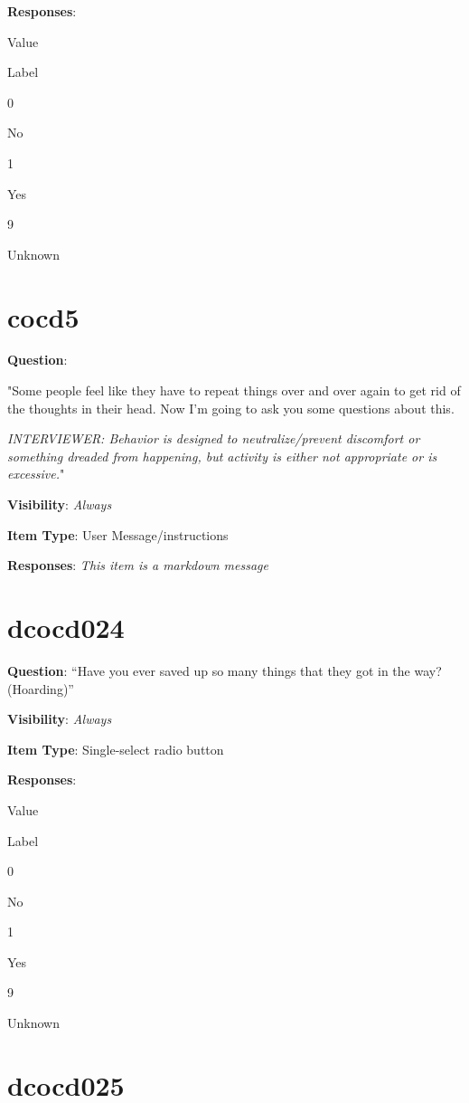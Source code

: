 \documentclass[]{book}
\begin{document}
\textbf{Responses}:

Value

Label

0

No

1

Yes

9

Unknown

\hypertarget{cocd5}{%
\section{cocd5}\label{cocd5}}

\textbf{Question}:

"Some people feel like they have to repeat things over and over again to get rid of the thoughts in their head. Now I'm going to ask you some questions about this.

\emph{INTERVIEWER: Behavior is designed to neutralize/prevent discomfort or something dreaded from happening, but activity is either not appropriate or is excessive.}"

\textbf{Visibility}: \emph{Always}

\textbf{Item Type}: User Message/instructions

\textbf{Responses}: \emph{This item is a markdown message}

\hypertarget{dcocd024}{%
\section{dcocd024}\label{dcocd024}}

\textbf{Question}: ``Have you ever saved up so many things that they got in the way? (Hoarding)''

\textbf{Visibility}: \emph{Always}

\textbf{Item Type}: Single-select radio button

\textbf{Responses}:

Value

Label

0

No

1

Yes

9

Unknown

\hypertarget{dcocd025}{%
\section{dcocd025}\label{dcocd025}}
\end{document}

